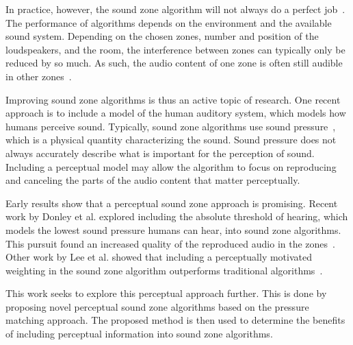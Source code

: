 In practice, however, the sound zone algorithm will not always do a perfect job~\cite{moller2016sound}.
The performance of algorithms depends on the environment and the available sound system.
Depending on the chosen zones, number and position of the loudspeakers, and the room, the interference between zones can typically only be reduced by so much.
As such, the audio content of one zone is often still audible in other zones~\cite{moller2016sound}.

Improving sound zone algorithms is thus an active topic of research.
One recent approach is to include a model of the human auditory system, which models how humans perceive sound.
Typically, sound zone algorithms use sound pressure~\cite{betlehem2015personal}, which is a physical quantity characterizing the sound.
Sound pressure does not always accurately describe what is important for the perception of sound.
Including a perceptual model may allow the algorithm to focus on reproducing and canceling the parts of the audio content
that matter perceptually.

Early results show that a perceptual sound zone approach is promising.
Recent work by Donley et al. explored including the absolute threshold of hearing, which models the lowest sound pressure
humans can hear, into sound zone algorithms.
This pursuit found an increased quality of the reproduced audio in the zones~\cite{donley2015multizone}.
Other work by Lee et al. showed that including a perceptually motivated weighting in the sound zone algorithm outperforms 
traditional algorithms~\cite{lee2019towards,lee2020signal}.

This work seeks to explore this perceptual approach further.
This is done by proposing novel perceptual sound zone algorithms based on the pressure matching approach.
The proposed method is then used to determine the benefits of including perceptual information into
sound zone algorithms.
